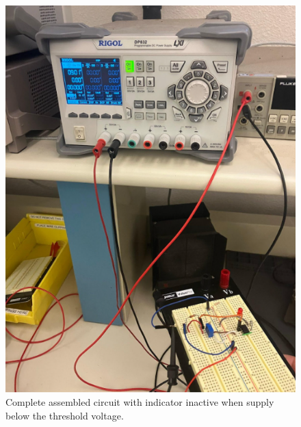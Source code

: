 \documentclass[conference]{IEEEtran}
\begin{document}
\begin{figure}[htbp]
\centerline{\includegraphics{./images/circuitbuilt1.png}}
\caption{Complete assembled circuit with indicator inactive when supply below the threshold voltage.}
\label{circuitbuilt1}
\end{figure}
\end{document}

